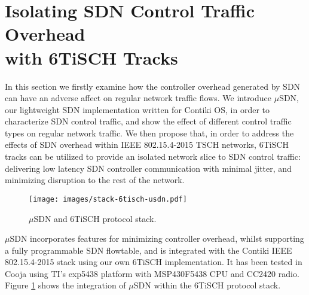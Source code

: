 
\section{Isolating SDN Control Traffic Overhead \\ with 6TiSCH Tracks}
\label{sec_motivation}

In this section we firstly examine how the controller overhead generated by SDN can have an adverse affect on regular network traffic flows. We introduce $\mu$SDN, our lightweight SDN implementation written for Contiki OS, in order to characterize SDN control traffic, and show the effect of different control traffic types on regular network traffic. We then propose that, in order to address the effects of SDN overhead within IEEE 802.15.4-2015 TSCH networks, 6TiSCH tracks can be utilized to provide an isolated network slice to SDN control traffic: delivering low latency SDN controller communication with minimal jitter, and minimizing disruption to the rest of the network.

\begin{figure}[ht]
\centering
	\texttt{[image: images/stack-6tisch-usdn.pdf]}
  \caption{$\mu$SDN and 6TiSCH protocol stack.}
  \label{fig:stack_6tisch_usdn}
\end{figure}

$\mu$SDN incorporates features for minimizing controller overhead, whilst supporting a fully programmable SDN flowtable, and is integrated with the Contiki IEEE 802.15.4-2015 stack using our own 6TiSCH implementation. It has been tested in Cooja using TI's exp5438 platform with MSP430F5438 CPU and CC2420 radio. Figure \ref{fig:stack_6tisch_usdn} shows the integration of $\mu$SDN within the 6TiSCH protocol stack. 

